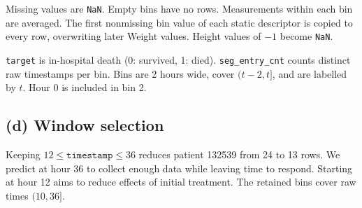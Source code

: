 \documentclass[11pt,a4paper]{article}
\begin{document}
Missing values are \texttt{NaN}. Empty bins have no rows. Measurements within each bin are averaged.
The first nonmissing bin value of each static descriptor is copied to every row, overwriting later Weight values.
Height values of $-1$ become \texttt{NaN}.

\texttt{target} is in-hospital death (0: survived, 1: died).
\texttt{seg\_entry\_cnt} counts distinct raw timestamps per bin.
Bins are 2 hours wide, cover $(t-2,t]$, and are labelled by $t$. Hour 0 is included in bin 2.

\subsection*{(d) Window selection}
Keeping $12\leq\texttt{timestamp}\leq36$ reduces patient 132539 from 24 to 13 rows.
We predict at hour 36 to collect enough data while leaving time to respond.
Starting at hour 12 aims to reduce effects of initial treatment. The retained bins cover raw times $(10,36]$.
\end{document}

